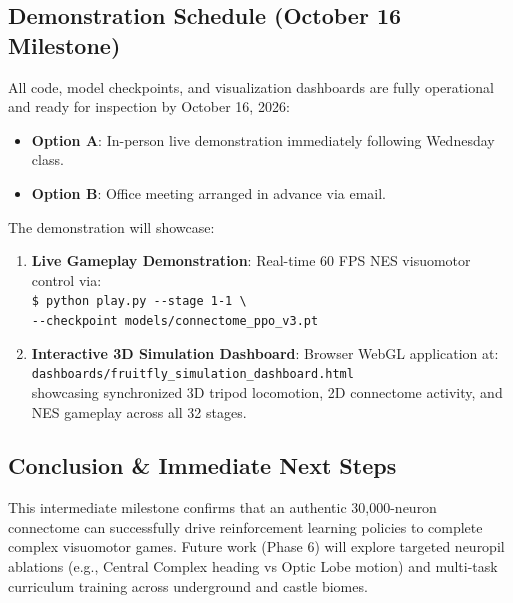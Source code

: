 \documentclass[10pt,twocolumn]{article}
\begin{document}
\subsection{Demonstration Schedule (October 16 Milestone)}
All code, model checkpoints, and visualization dashboards are fully operational and ready for inspection by October 16, 2026:
\begin{itemize}
    \item \textbf{Option A}: In-person live demonstration immediately following Wednesday class.
    \item \textbf{Option B}: Office meeting arranged in advance via email.
\end{itemize}
The demonstration will showcase:
\begin{enumerate}
    \item \textbf{Live Gameplay Demonstration}: Real-time 60 FPS NES visuomotor control via:\\
    \texttt{\$ python play.py -{}-stage 1-1 \textbackslash}\\
    \hspace*{1.2em}\texttt{-{}-checkpoint models/connectome\_ppo\_v3.pt}
    \item \textbf{Interactive 3D Simulation Dashboard}: Browser WebGL application at:\\
    \texttt{dashboards/fruitfly\_simulation\_dashboard.html}\\
    showcasing synchronized 3D tripod locomotion, 2D connectome activity, and NES gameplay across all 32 stages.
\end{enumerate}

\subsection{Conclusion \& Immediate Next Steps}
This intermediate milestone confirms that an authentic 30,000-neuron connectome can successfully drive reinforcement learning policies to complete complex visuomotor games. Future work (Phase 6) will explore targeted neuropil ablations (e.g., Central Complex heading vs Optic Lobe motion) and multi-task curriculum training across underground and castle biomes.

\newpage
\end{document}
